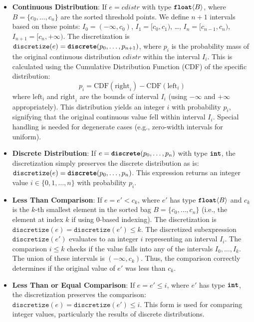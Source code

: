 \documentclass[acmsmall,screen,dvipsnames,x11names,nonacm,anonymous,review]{acmart}
\newcommand{\discrete}{\text{\ttfamily\bfseries discrete}}
\newcommand{\intty}{\text{\ttfamily\bfseries int}}
\newcommand{\float}{\text{\ttfamily\bfseries float}}
\begin{document}
\begin{itemize}
    \item \textbf{Continuous Distribution}: If $e = cdistr$ with type $\float\langle B \rangle$, where $B = \{c_0, \dots, c_n\}$ are the sorted threshold points. We define $n+1$ intervals based on these points: $I_0 = (-\infty, c_0)$, $I_1 = [c_0, c_1)$, \dots, $I_n = [c_{n-1}, c_n)$, $I_{n+1} = [c_n, +\infty)$. The discretization is $\texttt{discretize}(e) = \discrete(p_0, \dots, p_{n+1})$, where $p_i$ is the probability mass of the original continuous distribution $cdistr$ within the interval $I_i$. This is calculated using the Cumulative Distribution Function (CDF) of the specific distribution:
    \[ p_i = \text{CDF}(\text{right}_i) - \text{CDF}(\text{left}_i) \]
    where $\text{left}_i$ and $\text{right}_i$ are the bounds of interval $I_i$ (using $-\infty$ and $+\infty$ appropriately). This \discrete{} distribution yields an integer $i$ with probability $p_i$, signifying that the original continuous value fell within interval $I_i$. Special handling is needed for degenerate cases (e.g., zero-width intervals for uniform).

    \item \textbf{Discrete Distribution}: If $e = \discrete(p_0, \ldots, p_n)$ with type $\intty$, the discretization simply preserves the discrete distribution as is: $\texttt{discretize}(e) = \discrete(p_0, \ldots, p_n)$. This expression returns an integer value $i \in \{0, 1, \ldots, n\}$ with probability $p_i$.

    \item \textbf{Less Than Comparison}: If $e = e' < c_k$, where $e'$ has type $\float\langle B \rangle$ and $c_k$ is the $k$-th smallest element in the sorted bag $B = \{c_0, \dots, c_n\}$ (i.e., the element at index $k$ if using 0-based indexing). The discretization is $\texttt{discretize}(e) = \texttt{discretize}(e') \leq k$. The discretized subexpression $\texttt{discretize}(e')$ evaluates to an integer $i$ representing an interval $I_i$. The comparison $i \leq k$ checks if the value falls into any of the intervals $I_0, \dots, I_k$. The union of these intervals is $(-\infty, c_k)$. Thus, the comparison correctly determines if the original value of $e'$ was less than $c_k$.

    \item \textbf{Less Than or Equal Comparison}: If $e = e' \leq i$, where $e'$ has type $\intty$, the discretization preserves the comparison: $\texttt{discretize}(e) = \texttt{discretize}(e') \leq i$. This form is used for comparing integer values, particularly the results of discrete distributions.


\end{itemize}
\end{document}
